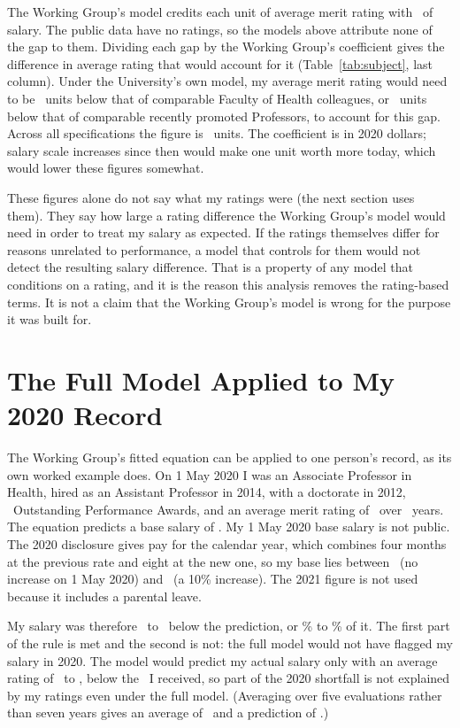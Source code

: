 \documentclass{article}
\begin{document}
The Working Group's model credits each unit of average merit rating with \WGRCoef\ of salary. The public data have no ratings, so the models above attribute none of the gap to them. Dividing each gap by the Working Group's coefficient gives the difference in average rating that would account for it (Table~\ref{tab:subject}, last column). Under the University's own model, my average merit rating would need to be \OnemainBreakEven\ units below that of comparable Faculty of Health colleagues, or \TwomainBreakEven\ units below that of comparable recently promoted Professors, to account for this gap. Across all specifications the figure is \BreakEvenRange\ units. The coefficient is in 2020 dollars; salary scale increases since then would make one unit worth more today, which would lower these figures somewhat.

These figures alone do not say what my ratings were (the next section uses them). They say how large a rating difference the Working Group's model would need in order to treat my salary as expected. If the ratings themselves differ for reasons unrelated to performance, a model that controls for them would not detect the resulting salary difference. That is a property of any model that conditions on a rating, and it is the reason this analysis removes the rating-based terms. It is not a claim that the Working Group's model is wrong for the purpose it was built for.

\section*{The Full Model Applied to My 2020 Record}

The Working Group's fitted equation can be applied to one person's record, as its own worked example does. On 1 May 2020 I was an Associate Professor in Health, hired as an Assistant Professor in 2014, with a doctorate in 2012, \WOPA\ Outstanding Performance Awards, and an average merit rating of \WRAvg\ over \WRN\ years. The equation predicts a base salary of \WFitted. My 1 May 2020 base salary is not public. The 2020 disclosure gives pay for the calendar year, which combines four months at the previous rate and eight at the new one, so my base lies between \WBaseLo\ (no increase on 1 May 2020) and \WBaseHi\ (a 10\% increase). The 2021 figure is not used because it includes a parental leave.

My salary was therefore \WGapLo\ to \WGapHi\ below the prediction, or \WRatioLo\% to \WRatioHi\% of it. The first part of the rule is met and the second is not: the full model would not have flagged my salary in 2020. The model would predict my actual salary only with an average rating of \WRMatchLo\ to \WRMatchHi, below the \WRAvg\ I received, so part of the 2020 shortfall is not explained by my ratings even under the full model. (Averaging over five evaluations rather than seven years gives an average of \WRAvgAlt\ and a prediction of \WFittedAlt.)
\end{document}

